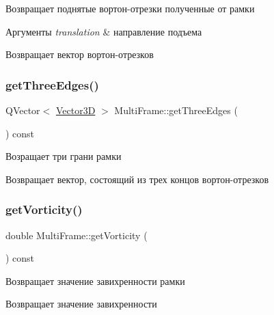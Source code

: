Возвращает поднятые вортон-\/отрезки полученные от рамки 
\begin{DoxyParams}{Аргументы}
{\em translation} & направление подъема \\
\hline
\end{DoxyParams}
\begin{DoxyReturn}{Возвращает}
вектор вортон-\/отрезков 
\end{DoxyReturn}
\mbox{\label{class_multi_frame_a0860bf9a98789ee07334f28e0015769a}} 
\subsubsection{\texorpdfstring{get\+Three\+Edges()}{getThreeEdges()}}
{\footnotesize\ttfamily Q\+Vector$<$ \mbox{\hyperlink{class_vector3_d}{Vector3D}} $>$ Multi\+Frame\+::get\+Three\+Edges (\begin{DoxyParamCaption}{ }\end{DoxyParamCaption}) const\hspace{0.3cm}{\ttfamily [virtual]}}

Возращает три грани рамки \begin{DoxyReturn}{Возвращает}
вектор, состоящий из трех концов вортон-\/отрезков 
\end{DoxyReturn}
\mbox{\label{class_multi_frame_aec90f5195c25d12a0caae0cf0fd27864}} 
\subsubsection{\texorpdfstring{get\+Vorticity()}{getVorticity()}}
{\footnotesize\ttfamily double Multi\+Frame\+::get\+Vorticity (\begin{DoxyParamCaption}{ }\end{DoxyParamCaption}) const\hspace{0.3cm}{\ttfamily [virtual]}}

Возвращает значение завихренности рамки \begin{DoxyReturn}{Возвращает}
значение завихренности 
\end{DoxyReturn}
\mbox{\label{class_multi_frame_a33c0682a1b9c8966c52f8c1274febde2}} 
